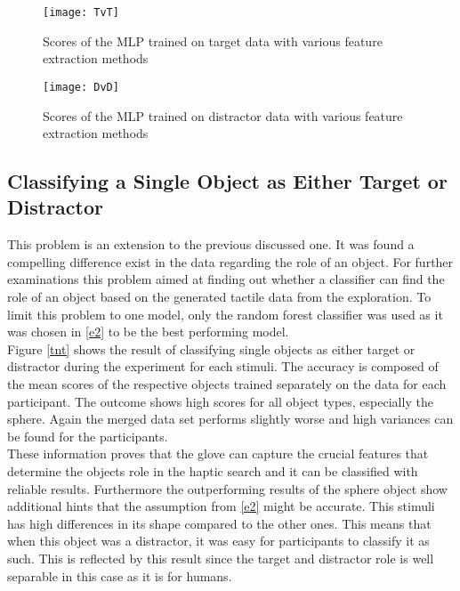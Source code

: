 
\begin{figure}[H]
	\centering
	\begin{minipage}{0.9\textwidth}
		\centering
		\texttt{[image: TvT]}
		\caption{Scores of the MLP trained on target data with various feature extraction methods}
		\label{tvt}
	\end{minipage}
	\begin{minipage}{0.9\textwidth}
		\centering
		\texttt{[image: DvD]}
		\caption{Scores of the MLP trained on distractor data with various feature extraction methods}
		\label{dvd}
	\end{minipage}
\end{figure}

\subsection{Classifying a Single Object as Either Target or Distractor}
This problem is an extension to the previous discussed one. It was found a compelling difference exist in the data regarding the role of an object. For further examinations this problem aimed at finding out whether a classifier can find the role of an object based on the generated tactile data from the exploration. To limit this problem to one model, only the random forest classifier was used as it was chosen in \ref{e2} to be the best performing model. \\
Figure \ref{tnt} shows the result of classifying single objects as either target or distractor during the experiment for each stimuli. The accuracy is composed of the mean scores of the respective objects trained separately on the data for each participant. The outcome shows high scores for all object types, especially the sphere. Again the merged data set performs slightly worse and high variances can be found for the participants.\\
These information proves that the glove can capture the crucial features that determine the objects role in the haptic search and it can be classified with reliable results. Furthermore the outperforming results of the sphere object show additional hints that the assumption from \ref{e2} might be accurate. This stimuli has high differences in its shape compared to the other ones. This means that when this object was a distractor, it was easy for participants to classify it as such. This is reflected by this result since the target and distractor role is well separable in this case as it is for humans. 

